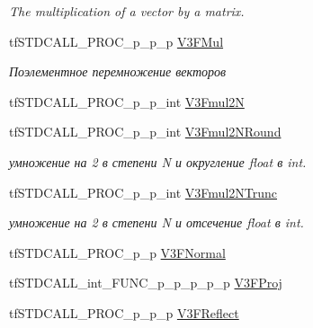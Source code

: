 \begin{DoxyCompactItemize}
\begin{DoxyCompactList}\small\item\em The multiplication of a vector by a matrix. \end{DoxyCompactList}\item 
\hypertarget{structs_functions_vector_c_p_u_a2862bac5ddf8b1461ce646b71884533f}{tf\-S\-T\-D\-C\-A\-L\-L\-\_\-\-P\-R\-O\-C\-\_\-p\-\_\-p\-\_\-p \hyperlink{structs_functions_vector_c_p_u_a2862bac5ddf8b1461ce646b71884533f}{V3\-F\-Mul}}\label{structs_functions_vector_c_p_u_a2862bac5ddf8b1461ce646b71884533f}

\begin{DoxyCompactList}\small\item\em Поэлементное перемножение векторов \end{DoxyCompactList}\item 
tf\-S\-T\-D\-C\-A\-L\-L\-\_\-\-P\-R\-O\-C\-\_\-p\-\_\-p\-\_\-int \hyperlink{structs_functions_vector_c_p_u_a0ac55e15fa9827353ab07d5d954720ab}{V3\-Fmul2\-N}
\item 
\hypertarget{structs_functions_vector_c_p_u_a66335f083ef675c8b86d12fb67ef21e8}{tf\-S\-T\-D\-C\-A\-L\-L\-\_\-\-P\-R\-O\-C\-\_\-p\-\_\-p\-\_\-int \hyperlink{structs_functions_vector_c_p_u_a66335f083ef675c8b86d12fb67ef21e8}{V3\-Fmul2\-N\-Round}}\label{structs_functions_vector_c_p_u_a66335f083ef675c8b86d12fb67ef21e8}

\begin{DoxyCompactList}\small\item\em умножение на 2 в степени N и округление float в int. \end{DoxyCompactList}\item 
\hypertarget{structs_functions_vector_c_p_u_a4251db26373678b3cb18be92c24ee4e6}{tf\-S\-T\-D\-C\-A\-L\-L\-\_\-\-P\-R\-O\-C\-\_\-p\-\_\-p\-\_\-int \hyperlink{structs_functions_vector_c_p_u_a4251db26373678b3cb18be92c24ee4e6}{V3\-Fmul2\-N\-Trunc}}\label{structs_functions_vector_c_p_u_a4251db26373678b3cb18be92c24ee4e6}

\begin{DoxyCompactList}\small\item\em умножение на 2 в степени N и отсечение float в int. \end{DoxyCompactList}\item 
tf\-S\-T\-D\-C\-A\-L\-L\-\_\-\-P\-R\-O\-C\-\_\-p\-\_\-p \hyperlink{structs_functions_vector_c_p_u_a95787020182f23684ad059e499af9fc3}{V3\-F\-Normal}
\item 
tf\-S\-T\-D\-C\-A\-L\-L\-\_\-int\-\_\-\-F\-U\-N\-C\-\_\-p\-\_\-p\-\_\-p\-\_\-p\-\_\-p \hyperlink{structs_functions_vector_c_p_u_a24997c8fee0b608b696a6dbb5b80cab9}{V3\-F\-Proj}
\item 
\hypertarget{structs_functions_vector_c_p_u_a36253e5fcdb211250072136966fbecb2}{tf\-S\-T\-D\-C\-A\-L\-L\-\_\-\-P\-R\-O\-C\-\_\-p\-\_\-p\-\_\-p \hyperlink{structs_functions_vector_c_p_u_a36253e5fcdb211250072136966fbecb2}{V3\-F\-Reflect}}\label{structs_functions_vector_c_p_u_a36253e5fcdb211250072136966fbecb2}


\end{DoxyCompactItemize}
